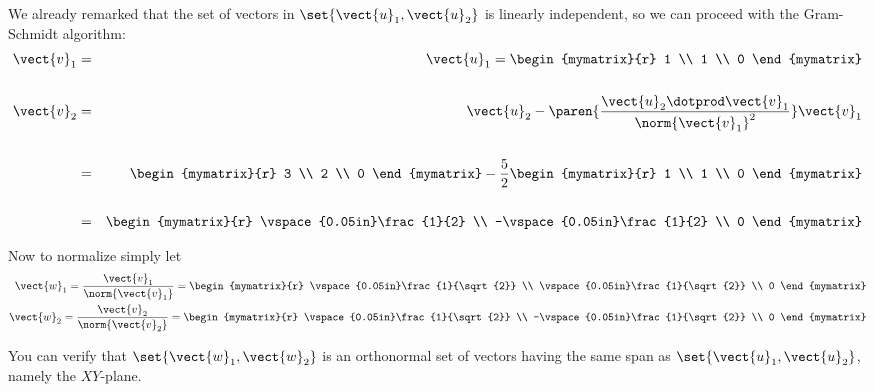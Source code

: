 \begin{solution}
We already remarked that the set of vectors in $\set{\vect{u}_1,
\vect{u}_2}$ is linearly independent, so we can proceed with the
Gram-Schmidt algorithm:
\begin{eqnarray*}
\vect{v}_1 &=& \vect{u}_1 =  \begin{mymatrix}{r}
1 \\
1 \\
0
\end{mymatrix} \\
&& \\
\vect{v}_{2} &=& \vect{u}_{2} - \paren{\dfrac{\vect{u}_2 \dotprod \vect{v}_1}{\norm{\vect{v}_1}^2}}  \vect{v}_1\\
&& \\
&=& \begin{mymatrix}{r}
3 \\
2 \\
0
\end{mymatrix}
-
\frac{5}{2}
 \begin{mymatrix}{r}
1 \\
1 \\
0
\end{mymatrix} \\
&&\\
&=&  \begin{mymatrix}{r}
\vspace{0.05in}\frac{1}{2} \\
-\vspace{0.05in}\frac{1}{2} \\
0
\end{mymatrix}
\end{eqnarray*}

Now to normalize simply let
\begin{eqnarray*}
\vect{w}_1  = \frac{\vect{v}_1}{\norm{\vect{v}_1}}  = \begin{mymatrix}{r}
\vspace{0.05in}\frac{1}{\sqrt{2}}  \\
\vspace{0.05in}\frac{1}{\sqrt{2}} \\
0
\end{mymatrix} \\
\vect{w}_2  = \frac{\vect{v}_2}{\norm{\vect{v}_2}}  = \begin{mymatrix}{r}
\vspace{0.05in}\frac{1}{\sqrt{2}}  \\
-\vspace{0.05in}\frac{1}{\sqrt{2}} \\
 0
\end{mymatrix}
\end{eqnarray*}

You can verify that $\set{\vect{w}_1, \vect{w}_2}$ is an orthonormal set of vectors  having the same span as
$\set{\vect{u}_1, \vect{u}_2}$,  namely the $XY$-plane.
\end{solution}

